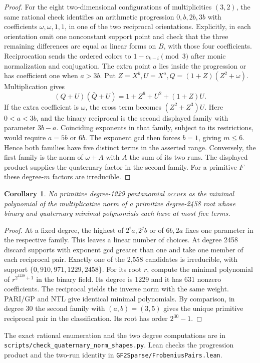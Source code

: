 \documentclass[11pt]{article}
\newtheorem{corollary}[theorem]{Corollary}
\begin{document}
\begin{proof}
For the eight two-dimensional configurations of multiplicities
\((3,2)\), the same rational check identifies an arithmetic progression
\(0,b,2b,3b\) with coefficients \(\omega,\omega,1,1\), in one of the
two reciprocal orientations. Explicitly, in each orientation omit one
nonconstant support point and check that the three remaining differences
are equal as linear forms on \(B\), with those four coefficients.
Reciprocation sends the ordered colors to \(1-c_{k-i}\pmod 3\) after
monic normalization and conjugation. The extra point \(a\) lies inside
the progression or has coefficient one when \(a>3b\).
Put \(Z=X^b, U=X^a, Q=(1+Z)(Z^2+\omega)\). Multiplication gives
\[
 (Q+U)(\bar Q+U)=1+Z^6+U^2+(1+Z)U .
\]
If the extra coefficient is \(\omega\), the cross term becomes
\((Z^2+Z^3)U\). Here \(0<a<3b\), and the binary reciprocal is the
second displayed family with parameter \(3b-a\). Coinciding exponents
in that family, subject to its restrictions, would require \(a=5b\)
or \(6b\). The exponent gcd then forces \(b=1\), giving \(m\le6\).
Hence both families have five distinct terms in the asserted range.
Conversely, the first family is the norm of \(\omega+A\) with \(A\)
the sum of its two runs. The displayed product supplies the quaternary
factor in the second family. For a primitive \(F\) these degree-\(m\)
factors are irreducible.
\end{proof}

\begin{corollary}\label{cor:1229-quaternary-lift}
No primitive degree-1229 pentanomial occurs as the minimal polynomial
of the multiplicative norm of a primitive degree-2458 root whose binary
and quaternary minimal polynomials each have at most five terms.
\end{corollary}
\begin{proof}
At a fixed degree, the highest of \(2^i a,2^j b\) or of \(6b,2a\)
fixes one parameter in the respective family. This leaves a linear
number of choices. At degree 2458 discard supports with exponent gcd
greater than one and take one member of each reciprocal pair. Exactly
one of the 2,558 candidates is irreducible, with support
\(\{0,910,971,1229,2458\}\). For its root \(r\), compute the minimal
polynomial of \(r^{2^{1229}+1}\) in the binary field. Its degree is
1229 and it has 631 nonzero coefficients. The reciprocal yields the
inverse norm with the same weight. PARI/GP and NTL give identical
minimal polynomials. By comparison, in degree 30 the second family
with \((a,b)=(3,5)\) gives the unique primitive reciprocal pair in
the classification. Its root has order \(2^{30}-1\).
\end{proof}
The exact rational enumeration and the two degree computations are in
\nolinkurl{scripts/check_quaternary_norm_shapes.py}. Lean checks the
progression product and the two-run identity in
\nolinkurl{GF2Sparse/FrobeniusPairs.lean}.
\end{document}
